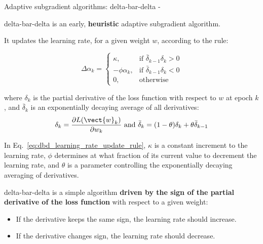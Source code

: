 

\begin{frame}[t,allowframebreaks]{
    Adaptive subgradient algorithms: delta-bar-delta -}
 
    \Gls{delta-bar-delta} \cite{Jacobs:1988dbd}
    is an early, {\bf heuristic}
    \gls{adaptive subgradient} algorithm.\\
    \vspace{0.2cm}

    It updates the
    \gls{learning rate}, 
    for a given weight $w$, according to the rule:
 
    \begin{equation}
        \Delta \alpha_{k} =
        \begin{cases}
            \kappa, & 
                \text{if } \bar{\delta}_{k-1} \delta_{k} > 0\\
            -\phi \alpha_{k}, & 
                \text{if } \bar{\delta}_{k-1} \delta_{k} < 0\\
            0, & 
                \text{otherwise}
        \end{cases}
        \label{eq:dbd_learning_rate_update_rule}
    \end{equation}
 
    where $\delta_{k}$ is the partial derivative of the 
    \gls{loss function} with respect to $w$ 
    at \gls{epoch} $k$,
    and $\bar{\delta}_{k}$ is an exponentially decaying average 
    of all derivatives:
    \begin{equation}
        \delta_{k} = \frac{\partial L(\vect{w}_k)}{\partial w_{k}}
        \text{   and   }
        \bar{\delta}_{k} = (1-\theta) \delta_{k} + \theta \bar{\delta}_{k-1}
        \label{eq:dbd_defs}
    \end{equation}

    In Eq.~\ref{eq:dbd_learning_rate_update_rule},
    $\kappa$ is a constant increment to the \gls{learning rate},
    $\phi$ determines at what fraction of its current value
    to decrement the \gls{learning rate}, and $\theta$ is a parameter
    controlling the exponentially decaying averaging of derivatives.

    \framebreak
 

    \Gls{delta-bar-delta} is a simple algorithm
    {\bf driven by the sign of the partial derivative 
    of the \gls{loss function}} 
    with respect to a given weight:
    \begin{itemize} 
        \item 
        If the derivative keeps the same sign, 
        the learning rate should increase.
        \item 
        If the derivative changes sign, 
        the learning rate should decrease.\\
    \end{itemize}
    \vspace{0.2cm}


\end{frame}
